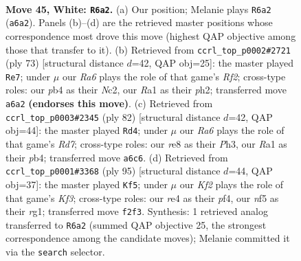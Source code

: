 \documentclass[11pt]{article}
\begin{document}
\clearpage

\begin{figure}[p]\centering
\begin{subfigure}{0.46\textwidth}\centering
\resizebox{\linewidth}{!}{%
\newchessgame
\chessboard[
  setfen={4r3/8/R2p1kp1/5n1p/1p2r2P/8/4NKP1/R7 w - - 1 45},
  showmover=false,
  pgfstyle=straightmove, color=movearrow, markmove={a6-a2}
]}
\caption{}
\end{subfigure}\hfill
\begin{subfigure}{0.46\textwidth}\centering
\resizebox{\linewidth}{!}{%
\newchessgame
\chessboard[
  setfen={1R6/5rk1/7p/6p1/8/6P1/2nr1P1P/3N1RK1 b - - 6 37},
  showmover=false,
  pgfstyle=straightmove, color=movearrow, markmove={f7-e7}
]}
\caption{}
\end{subfigure}
\\[4pt]
\begin{subfigure}{0.46\textwidth}\centering
\resizebox{\linewidth}{!}{%
\newchessgame
\chessboard[
  setfen={6r1/1R1R2pk/1p3r1p/8/1p3P2/7P/6PK/8 w - - 0 42},
  showmover=false,
  pgfstyle=straightmove, color=movearrow, markmove={d7-d4}
]}
\caption{}
\end{subfigure}\hfill
\begin{subfigure}{0.46\textwidth}\centering
\resizebox{\linewidth}{!}{%
\newchessgame
\chessboard[
  setfen={8/8/P1R1pk2/8/2p1pP2/7P/r1r3PK/6R1 b - - 8 48},
  showmover=false,
  pgfstyle=straightmove, color=movearrow, markmove={f6-f5}
]}
\caption{}
\end{subfigure}
\caption{\textbf{Move 45, White: \texttt{R6a2}.} (a) Our position; Melanie plays \texttt{R6a2} (\texttt{a6a2}). Panels (b)--(d) are the retrieved master positions whose correspondence most drove this move (highest QAP objective among those that transfer to it). (b) Retrieved from \texttt{ccrl\_top\_p0002\#2721} (ply 73) [structural distance $d$=42, QAP obj=25]: the master played \texttt{Re7}; under $\mu$ our \emph{Ra6} plays the role of that game's \emph{Rf2}; cross-type roles: our \emph{p}b4 as their \emph{N}c2, our \emph{R}a1 as their \emph{p}h2; transferred move \texttt{a6a2} \textbf{(endorses this move)}. (c) Retrieved from \texttt{ccrl\_top\_p0003\#2345} (ply 82) [structural distance $d$=42, QAP obj=44]: the master played \texttt{Rd4}; under $\mu$ our \emph{Ra6} plays the role of that game's \emph{Rd7}; cross-type roles: our \emph{r}e8 as their \emph{P}h3, our \emph{R}a1 as their \emph{p}b4; transferred move \texttt{a6c6}. (d) Retrieved from \texttt{ccrl\_top\_p0001\#3368} (ply 95) [structural distance $d$=44, QAP obj=37]: the master played \texttt{Kf5}; under $\mu$ our \emph{Kf2} plays the role of that game's \emph{Kf3}; cross-type roles: our \emph{r}e4 as their \emph{p}f4, our \emph{n}f5 as their \emph{r}g1; transferred move \texttt{f2f3}. Synthesis: 1 retrieved analog transferred to \texttt{R6a2} (summed QAP objective 25, the strongest correspondence among the candidate moves); Melanie committed it via the \texttt{search} selector.}
\label{fig:thought-m88}
\end{figure}
\end{document}
